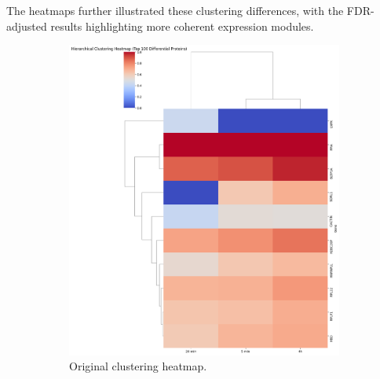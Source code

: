 \documentclass{article}
\begin{document}
      The heatmaps further illustrated these clustering differences, with the FDR-adjusted results highlighting more coherent expression modules. 
      
      \begin{figure}[H]
        \centering
        \begin{subfigure}{0.45\textwidth}
            \includegraphics[width=\linewidth]{figures/clustering_heatmap.png}
            \caption{Original clustering heatmap.}
            \label{fig:clustering_heatmap}
        \end{subfigure}
        \hfill
        \begin{subfigure}{0.45\textwidth}

\end{subfigure}
\end{figure}
\end{document}
